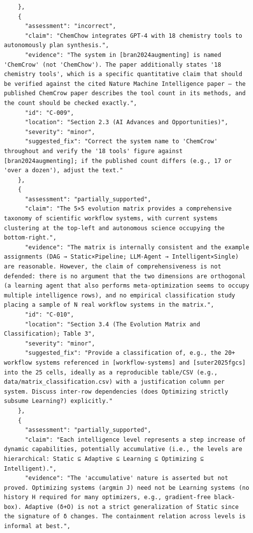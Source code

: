 \documentclass[11pt]{article}
\begin{document}
\begin{verbatim}
    },
    {
      "assessment": "incorrect",
      "claim": "ChemChow integrates GPT-4 with 18 chemistry tools to autonomously plan synthesis.",
      "evidence": "The system in [bran2024augmenting] is named 'ChemCrow' (not 'ChemChow'). The paper additionally states '18 chemistry tools', which is a specific quantitative claim that should be verified against the cited Nature Machine Intelligence paper — the published ChemCrow paper describes the tool count in its methods, and the count should be checked exactly.",
      "id": "C-009",
      "location": "Section 2.3 (AI Advances and Opportunities)",
      "severity": "minor",
      "suggested_fix": "Correct the system name to 'ChemCrow' throughout and verify the '18 tools' figure against [bran2024augmenting]; if the published count differs (e.g., 17 or 'over a dozen'), adjust the text."
    },
    {
      "assessment": "partially_supported",
      "claim": "The 5×5 evolution matrix provides a comprehensive taxonomy of scientific workflow systems, with current systems clustering at the top-left and autonomous science occupying the bottom-right.",
      "evidence": "The matrix is internally consistent and the example assignments (DAG → Static×Pipeline; LLM-Agent → Intelligent×Single) are reasonable. However, the claim of comprehensiveness is not defended: there is no argument that the two dimensions are orthogonal (a learning agent that also performs meta-optimization seems to occupy multiple intelligence rows), and no empirical classification study placing a sample of N real workflow systems in the matrix.",
      "id": "C-010",
      "location": "Section 3.4 (The Evolution Matrix and Classification); Table 3",
      "severity": "minor",
      "suggested_fix": "Provide a classification of, e.g., the 20+ workflow systems referenced in [workflow-systems] and [suter2025fgcs] into the 25 cells, ideally as a reproducible table/CSV (e.g., data/matrix_classification.csv) with a justification column per system. Discuss inter-row dependencies (does Optimizing strictly subsume Learning?) explicitly."
    },
    {
      "assessment": "partially_supported",
      "claim": "Each intelligence level represents a step increase of dynamic capabilities, potentially accumulative (i.e., the levels are hierarchical: Static ⊆ Adaptive ⊆ Learning ⊆ Optimizing ⊆ Intelligent).",
      "evidence": "The 'accumulative' nature is asserted but not proved. Optimizing systems (argmin J) need not be Learning systems (no history H required for many optimizers, e.g., gradient-free black-box). Adaptive (δ+O) is not a strict generalization of Static since the signature of δ changes. The containment relation across levels is informal at best.",

\end{verbatim}
\end{document}
